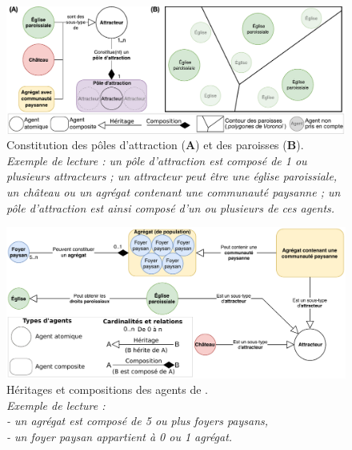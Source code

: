 \vspace*{7em}
\begin{figure}[H]
	\centering
	\includegraphics[width=\linewidth]{img/agents_paroisses_poles.pdf}
	\caption[Constitution des pôles d'attraction et des paroisses.]{Constitution des pôles d'attraction (\textbf{A}) et des paroisses (\textbf{B}).\\
		\textit{Exemple de lecture : un pôle d'attraction est composé de 1 ou plusieurs attracteurs ;
			un attracteur peut être une église paroissiale, un château ou un agrégat contenant une communauté paysanne ;
			un pôle d'attraction est ainsi composé d'un ou plusieurs de ces agents.}}
	\label{fig:constitution-poles-paroisses}
\end{figure}
\vspace{5em}
\begin{figure}[H]
	\centering
	\includegraphics[width=\linewidth]{img/agents_constitution.pdf}
	\caption[Héritages et compositions des agents de \simfeodal{}.]{Héritages et compositions des agents de \simfeodal{}.\\
		\textit{Exemple de lecture :\\
			- un agrégat est composé de 5 ou plus foyers paysans,\\
			- un foyer paysan appartient à 0 ou 1 agrégat.}}
	\label{fig:constitution-agents}
\end{figure}
\clearpage

